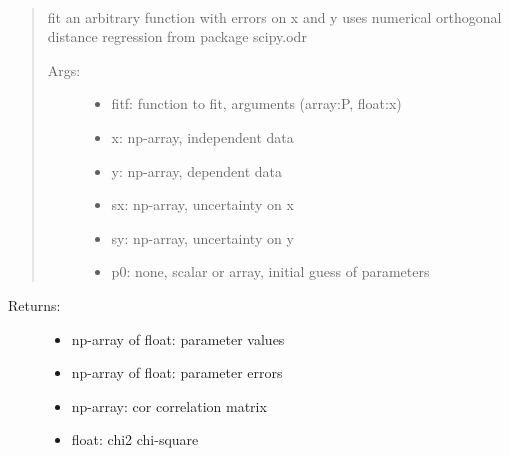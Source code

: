 \documentclass[letterpaper,10pt,english]{sphinxmanual}
\begin{document}
\begin{fulllineitems}
\label{\detokenize{index:PhyPraKit.PhyPraKit.odFit}}~\begin{quote}

fit an arbitrary function with errors on x and y
uses numerical \sphinxquotedblleft{}orthogonal distance regression\sphinxquotedblright{} from package scipy.odr
\begin{description}
\item[{Args:}] \leavevmode\begin{itemize}
\item {} 
fitf: function to fit, arguments (array:P, float:x)

\item {} 
x:  np-array, independent data

\item {} 
y:  np-array, dependent data

\item {} 
sx: np-array, uncertainty on x

\item {} 
sy: np-array, uncertainty on y

\item {} 
p0: none, scalar or array, initial guess of parameters

\end{itemize}

\end{description}
\end{quote}
\begin{description}
\item[{Returns:}] \leavevmode\begin{itemize}
\item {} 
np-array of float: parameter values

\item {} 
np-array of float: parameter errors

\item {} 
np-array: cor   correlation matrix

\item {} 
float: chi2  chi-square

\end{itemize}

\end{description}

\end{fulllineitems}
\end{document}
